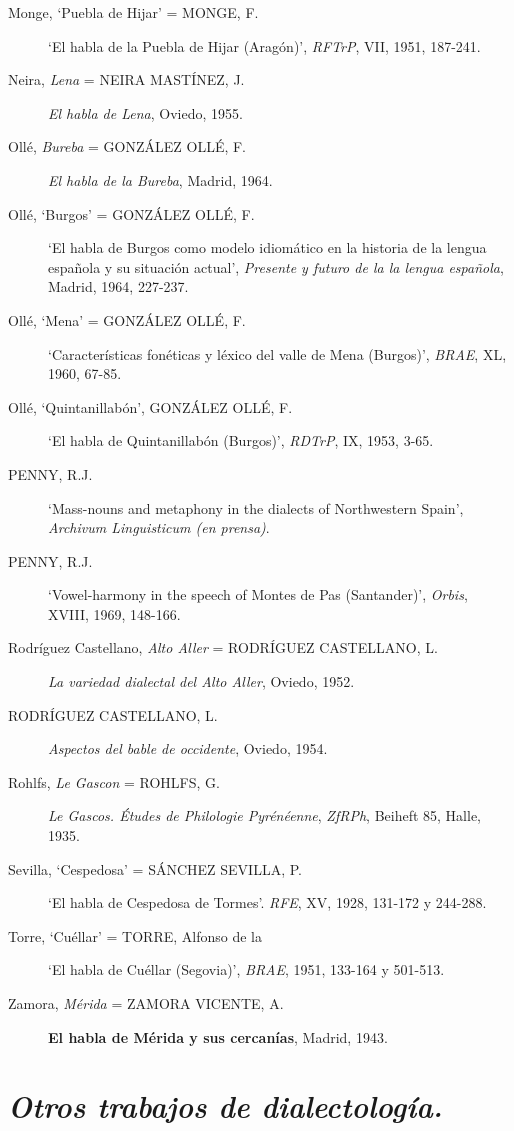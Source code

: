 \documentclass[11pt,spanish,b5paper]{book}
\begin{document}
\begin{description}
\item[Monge, `Puebla de Hijar' = MONGE, F.] `El habla de la Puebla de Hijar (Aragón)', \textit{RFTrP}, VII, 1951, 187-241.
\item[Neira, \textit{Lena} = NEIRA MASTÍNEZ, J.] \textit{El habla de Lena}, Oviedo, 1955. 
\item[Ollé, \textit{Bureba} = GONZÁLEZ OLLÉ, F.] \textit{El habla de la Bureba}, Madrid, 1964.
\item[Ollé, `Burgos' = GONZÁLEZ OLLÉ, F.] `El habla de Burgos como modelo idiomático en la historia de la lengua española y su situación actual', \textit{Presente y futuro de la la lengua española}, Madrid, 1964, 227-237.
\item[Ollé, `Mena' = GONZÁLEZ OLLÉ, F.] `Características fonéticas y léxico del valle de Mena (Burgos)', \textit{BRAE}, XL, 1960, 67-85.
\item[Ollé, `Quintanillabón', GONZÁLEZ OLLÉ, F.] `El habla de Quintanillabón (Burgos)', \textit{RDTrP}, IX, 1953, 3-65.
\item[PENNY, R.J.] `Mass-nouns and metaphony in the dialects of Northwestern Spain', \textit{Archivum Linguisticum (en prensa)}. 
\item[PENNY, R.J.] `Vowel-harmony in the speech of Montes de Pas (Santander)', \textit{Orbis}, XVIII, 1969, 148-166. 
\item[Rodríguez Castellano, \textit{Alto Aller} = RODRÍGUEZ CASTELLANO, L.] \textit{La variedad dialectal del Alto Aller}, Oviedo, 1952. 
\item[RODRÍGUEZ CASTELLANO, L.] \textit{Aspectos del bable de occidente}, Oviedo, 1954. 
\item[Rohlfs, \textit{Le Gascon} = ROHLFS, G.] \textit{Le Gascos. Études de Philologie Pyrénéenne}, \textit{ZfRPh}, Beiheft 85, Halle, 1935.
\item[Sevilla, `Cespedosa' = SÁNCHEZ SEVILLA, P.] `El habla de Cespedosa de Tormes'. \textit{RFE}, XV, 1928, 131-172 y 244-288.
\item[Torre, `Cuéllar' = TORRE, Alfonso de la] `El habla de Cuéllar (Segovia)', \textit{BRAE}, 1951, 133-164 y 501-513. 
\item[Zamora, \textit{Mérida} = ZAMORA VICENTE, A.] \textbf{El habla de Mérida y sus cercanías}, Madrid, 1943. 
\end{description}


\section{\emph{Otros trabajos de dialectología.}}
\setcounter{subsection}{18}
\end{document}
